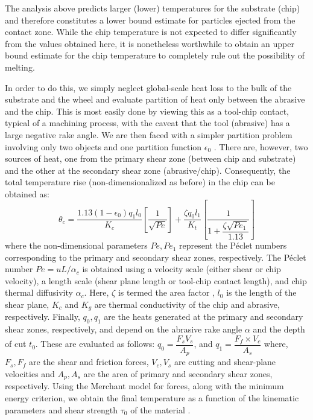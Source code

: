 \documentclass[11pt]{article}
\begin{document}
The analysis above predicts larger (lower) temperatures for the substrate (chip) and therefore constitutes a lower bound estimate for particles ejected from the contact zone. While the chip temperature is not expected to differ significantly from the values obtained here, it is nonetheless worthwhile to obtain an upper bound estimate for the chip temperature to completely rule out the possibility of melting.   

In order to do this, we simply neglect global-scale heat loss to the bulk of the substrate and the wheel and evaluate partition of heat only between the abrasive and the chip. This is most easily done by viewing this as a tool-chip contact, typical of a machining process, with the caveat that the tool (abrasive) has a large negative rake angle. We are then faced with a simpler partition problem involving only two objects and one partition function $\epsilon_0$ \cite{loewen1954analysis}. There are, however, two sources of heat, one from the primary shear zone (between chip and substrate) and the other at the secondary shear zone (abrasive/chip). Consequently, the total temperature rise (non-dimensionalized as before) in the chip can be obtained as:
\begin{equation}
  \label{eqn:chipTempUB}
  \theta_c =\dfrac{1.13(1-\epsilon_0)q_1 l_0}{K_c}\left[\dfrac{1}{\sqrt{Pe}}\right]+\dfrac{\zeta q_0 l_1}{K_t}\left[\dfrac{1}{1+\dfrac{\zeta\sqrt{Pe_1}}{1.13}}\right]
\end{equation}
where the non-dimensional parameters $Pe, Pe_1$ represent the P\'eclet numbers corresponding to the primary and secondary shear zones, respectively. The P\'eclet number $Pe = uL/\alpha_c$ is obtained using a velocity scale (either shear or chip velocity), a length scale (shear plane length or tool-chip contact length), and chip thermal diffusivity $\alpha_c$. Here, $\zeta$ is termed the area factor \cite{loewen1954analysis}, $l_0$ is the length of the shear plane, $K_c$ and $K_g$ are thermal conductivity of the chip and abrasive, respectively. Finally, $q_0, q_1$ are the heats generated at the primary and secondary shear zones, respectively, and depend on the abrasive rake angle $\alpha$ and the depth of cut $t_0$. These are evaluated as follows: $q_0=\dfrac{F_s V_s}{A_p}$, and $q_1=\dfrac{F_f\times V_c}{A_s}$ where, $F_s, F_f$ are the shear and friction forces, $V_c, V_s$ are cutting and shear-plane velocities and $A_p, A_s$ are the area of primary and secondary shear zones, respectively. Using the Merchant model for forces, along with the minimum energy criterion, we obtain the final temperature as a function of the kinematic parameters and shear strength $\tau_0$ of the material \cite{merchant1945mechanics}. 
\end{document}
